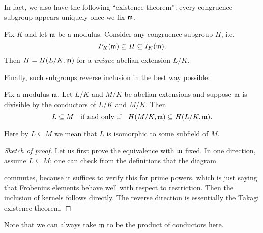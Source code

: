 In fact, we also have the following ``existence theorem'':
every congruence subgroup appears uniquely once we fix $\mathfrak m$.
\begin{theorem}
	Fix $K$ and let $\mathfrak m$ be a modulus.
	Consider any congruence subgroup $H$, i.e.\
	\[ P_K(\mathfrak m) \subseteq H \subseteq I_K(\mathfrak m). \]
	Then $H = H(L/K, \mathfrak m)$ for a \emph{unique} abelian extension $L/K$.
\end{theorem}

Finally, such subgroups reverse inclusion in the best way possible:
\begin{lemma}
	Fix a modulus $\mathfrak m$.
	Let $L/K$ and $M/K$ be abelian extensions
	and suppose $\mathfrak m$ is divisible by the conductors of $L/K$ and $M/K$.
	Then
	\[ L \subseteq M
		\quad\text{if and only if}\quad
		H(M/K, \mathfrak m) \subseteq H(L/K, \mathfrak m).  \]
\end{lemma}
Here by $L \subseteq M$ we mean that $L$ is isomorphic to some subfield of $M$.
\begin{proof}
	[Sketch of proof]
	Let us first prove the equivalence with $\mathfrak m$ fixed.
	In one direction, assume $L \subseteq M$;
	one can check from the definitions that the diagram
	\begin{center}
	\end{center}
	commutes, because it suffices to verify this for prime powers,
	which is just saying that Frobenius elements behave well
	with respect to restriction.
	Then the inclusion of kernels follows directly.
	The reverse direction is essentially the Takagi existence theorem.
\end{proof}
Note that we can always take $\mathfrak m$ to be the product of conductors here.

\bigskip

